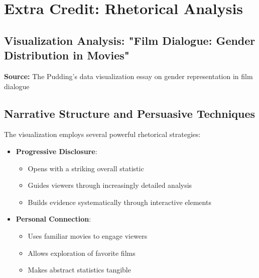 \documentclass{article}
\begin{document}
\section*{Extra Credit: Rhetorical Analysis}
\subsection*{Visualization Analysis: "Film Dialogue: Gender Distribution in Movies"}

\textbf{Source:} The Pudding's data visualization essay on gender representation in film dialogue

\subsection*{Narrative Structure and Persuasive Techniques}
The visualization employs several powerful rhetorical strategies:
\begin{itemize}
    \item \textbf{Progressive Disclosure}:
        \begin{itemize}
            \item Opens with a striking overall statistic
            \item Guides viewers through increasingly detailed analysis
            \item Builds evidence systematically through interactive elements
        \end{itemize}
    \item \textbf{Personal Connection}:
        \begin{itemize}
            \item Uses familiar movies to engage viewers
            \item Allows exploration of favorite films
            \item Makes abstract statistics tangible
        \end{itemize}
\end{itemize}
\end{document}
